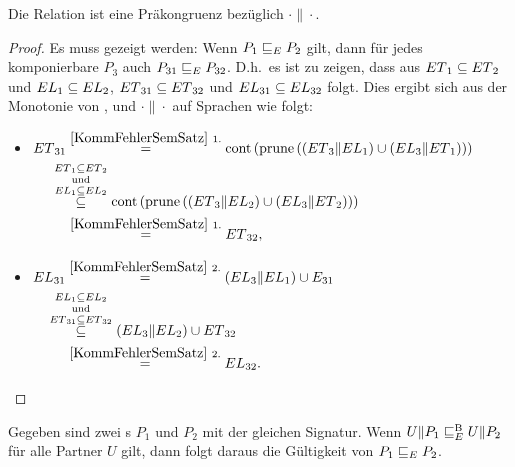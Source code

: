 \begin{Kor}
  \label{KommPräkonKor}
  Die Relation \ERel{} ist eine Präkongruenz bezüglich $\cdot\|\cdot$.
\end{Kor}
\begin{proof}
  Es muss gezeigt werden: Wenn $P_1 \sqsubseteq  _E P_2$ gilt, dann für jedes
  komponierbare $P_3$ auch $P_{31} \sqsubseteq  _E P_{32}$. D.h.\ es ist zu zeigen,
  dass aus $ET{}_1\subseteq ET{}_2$ und $EL{}_1\subseteq EL{}_2$,
  $ET{}_{31}\subseteq ET{}_{32}$ und $EL{}_{31}\subseteq
  EL{}_{32}$ folgt. Dies ergibt sich aus der Monotonie von \cont{},
  \prune{} und $\cdot \|\cdot$ auf Sprachen wie folgt:\\
  \begin{itemize}
    \item $\begin{aligned}[t]
        \ET{}_{31} &\overset{\ref{KommFehlerSemSatz}~1.}{=}
      \cont{}\left(\prune{}\left(\left(\ET{}_3\|\EL{}_1\right)\cup
          \left(\EL{}_3\|\ET{}_1\right)\right)\right)\\
      &\hspace{-0.4cm}\overset{\ET{}_1\subseteq
    \ET{}_2}{\overset{\mathrm{und}}{\overset{\EL{}_1\subseteq \EL{}_2}{\subseteq}}}
    \cont{}\left(\prune{}\left(\left(\ET{}_3\|\EL{}_2\right)\cup
        \left(\EL{}_3\|\ET{}_2\right)\right)\right)\\
    &\overset{\ref{KommFehlerSemSatz}~1.}{=} \ET{}_{32},
    \end{aligned}$
    \item $\begin{aligned}[t]
        \EL{}_{31} &\overset{\ref{KommFehlerSemSatz}~2.}{=}
        (\EL{}_3\|\EL{}_1)\cup E_{31}\\
        &\hspace{-0.5cm}\overset{\EL{}_1\subseteq
      \EL{}_2}{\overset{\mathrm{und}}{\overset{\ET{}_{31}\subseteq
      \ET{}_{32}}{\subseteq}}} (\EL{}_3\|\EL{}_2)\cup \ET{}_{32}\\
      &\overset{\ref{KommFehlerSemSatz}~2.}{=} \EL{}_{32}.
    \end{aligned}$
  \end{itemize}
\end{proof}

\begin{Lem}
  \label{KommVerfeinLem}
  Gegeben sind zwei \MEIO{}s $P_1$ und $P_2$ mit der gleichen Signatur. Wenn
  $U\|P_1 \sqsubseteq  _E^\mathrm{B}{} U\|P_2$ für alle Partner $U$ gilt, dann folgt daraus die
  Gültigkeit von $P_1 \sqsubseteq  _E{} P_2$.
\end{Lem}

